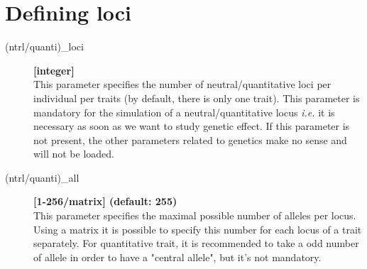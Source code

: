 \documentclass[letterpaper,12pt,oneside]{book}
\begin{document}
\section{Defining loci}
\label{sec:DefiningLoci}
\begin{description}
\item[(ntrl/quanti)\_loci] \textbf{[integer]}\\
This parameter specifies the number of neutral/quantitative loci per individual per traits (by default, there is only one trait). This parameter is mandatory for the simulation of a neutral/quantitative locus \textit{i.e.} it is necessary as soon as we want to study genetic effect. If this parameter is not present, the other parameters related to genetics make no sense and will not be loaded. 

\item[(ntrl/quanti)\_all] \textbf{[1-256/matrix] (default: 255)}\\
This parameter specifies the maximal possible number of alleles per locus. Using a matrix it is possible to specify this number for each locus of a trait separately. For quantitative trait, it is recommended to take a odd number of allele in order to have a "central allele", but it's not mandatory. 
\end{description}
\end{document}
